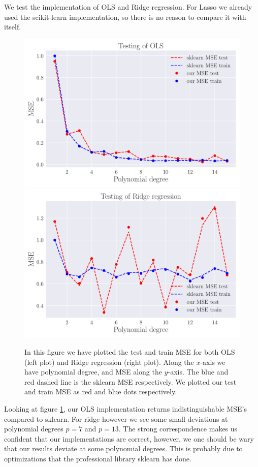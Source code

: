 \documentclass[reprint,english,notitlepage,aps,nobalancelastpage,nofootinbib]{revtex4-1}  %
\begin{document}
We test the implementation of OLS and Ridge regression. For Lasso we already used the scikit-learn implementation, so there is no reason to compare it with itself.
\begin{figure}[H]
	\includegraphics[width=\linewidth]{Testing_OLS.pdf}
	\endminipage\hfill
	\includegraphics[width=\linewidth]{Testing_Ridge.pdf}
	\endminipage
	\caption{In this figure we have plotted the test and train MSE for both OLS (left plot) and Ridge regression (right plot). Along the $x$-axis we have polynomial degree, and MSE along the $y$-axis. The blue and red dashed line is the sklearn MSE respectively. We plotted our test and train MSE as red and blue dots respectively.}
	\label{fig:test_OLS_Ridge}
\end{figure}
Looking at figure \ref{fig:test_OLS_Ridge}, our OLS implementation returns indistinguishable MSE's compared to sklearn. For ridge however we see some small deviations at polynomial degrees $p=7$ and $p = 13$. The strong correspondence makes us confident that our implementations are correct, however, we one should be wary that our results deviate at some polynomial degrees. This is probably due to optimizations that the professional library sklearn has done.
\end{document}
